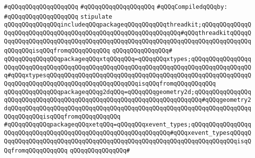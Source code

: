 \verb|#qQQqqQQqqQQqqQQqqQQq|\newline
\verb|#qQQqqQQqqQQqqQQqqQQq|\newline
\newline
\verb|#qQQqCompiledqQQqby:|\newline
\verb|#qQQqqQQqqQQqqQQqqQQq|\newline
\newline
\verb|stipulate|\newline
\verb|qQQqqQQqqQQqqQQqincludeqQQqpackageqQQqqQQqqQQqthreadkit;qQQqqQQqqQQqqQQqqQQqqQQqqQQqqQQqqQQqqQQqqQQqqQQqqQQqqQQqqQQqqQQq#qQQqthreadkitqQQqqQQqqQQqqQQqqQQqqQQqqQQqqQQqqQQqqQQqqQQqqQQqqQQqqQQqqQQqqQQqqQQqqQQqqQQqqQQqqQQqisqQQqfromqQQqqQQqqQQq|\newline
\verb|qQQqqQQqqQQqqQQq#|\newline
\verb|qQQqqQQqqQQqqQQqpackageqQQqxtqQQqqQQq=qQQqqQQqxtypes;qQQqqQQqqQQqqQQqqQQqqQQqqQQqqQQqqQQqqQQqqQQqqQQqqQQqqQQqqQQqqQQqqQQqqQQqqQQqqQQqqQQqqQQq#qQQqxtypesqQQqqQQqqQQqqQQqqQQqqQQqqQQqqQQqqQQqqQQqqQQqqQQqqQQqqQQqqQQqqQQqqQQqqQQqqQQqqQQqqQQqqQQqqQQqqQQqisqQQqfromqQQqqQQqqQQq|\newline
\verb|qQQqqQQqqQQqqQQqpackageqQQqg2dqQQq=qQQqqQQqgeometry2d;qQQqqQQqqQQqqQQqqQQqqQQqqQQqqQQqqQQqqQQqqQQqqQQqqQQqqQQqqQQqqQQqqQQqqQQq#qQQqgeometry2dqQQqqQQqqQQqqQQqqQQqqQQqqQQqqQQqqQQqqQQqqQQqqQQqqQQqqQQqqQQqqQQqqQQqqQQqqQQqqQQqisqQQqfromqQQqqQQqqQQq|\newline
\verb|#qQQqqQQqqQQqpackageqQQqxetqQQq=qQQqqQQqxevent_types;qQQqqQQqqQQqqQQqqQQqqQQqqQQqqQQqqQQqqQQqqQQqqQQqqQQqqQQqqQQqqQQq#qQQqxevent_typesqQQqqQQqqQQqqQQqqQQqqQQqqQQqqQQqqQQqqQQqqQQqqQQqqQQqqQQqqQQqqQQqqQQqqQQqisqQQqfromqQQqqQQqqQQq|\newline
\verb|qQQqqQQqqQQqqQQq#|\newline
